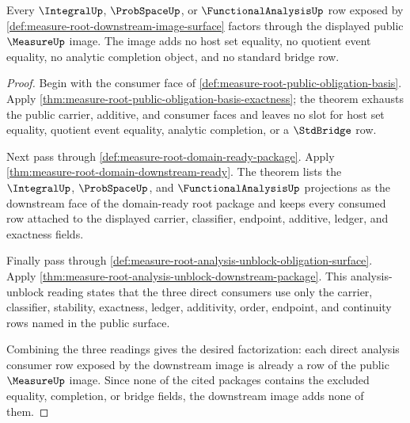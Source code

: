 \begin{theorem}
\label{thm:measure-root-downstream-image-consumer}
Every $\IntegralUp$, $\ProbSpaceUp$, or $\FunctionalAnalysisUp$ row exposed
by \autoref{def:measure-root-downstream-image-surface} factors through the
displayed public $\MeasureUp$ image. The image adds no host set equality, no
quotient event equality, no analytic completion object, and no standard
bridge row.
\end{theorem}
\begin{proof}
Begin with the consumer face of
\autoref{def:measure-root-public-obligation-basis}. Apply
\autoref{thm:measure-root-public-obligation-basis-exactness}; the theorem
exhausts the public carrier, additive, and consumer faces and leaves no slot
for host set equality, quotient event equality, analytic completion, or a
$\StdBridge$ row.

Next pass through \autoref{def:measure-root-domain-ready-package}. Apply
\autoref{thm:measure-root-domain-downstream-ready}. The theorem lists the
$\IntegralUp$, $\ProbSpaceUp$, and $\FunctionalAnalysisUp$ projections as the
downstream face of the domain-ready root package and keeps every consumed row
attached to the displayed carrier, classifier, endpoint, additive, ledger,
and exactness fields.

Finally pass through
\autoref{def:measure-root-analysis-unblock-obligation-surface}. Apply
\autoref{thm:measure-root-analysis-unblock-downstream-package}. This
analysis-unblock reading states that the three direct consumers use only the
carrier, classifier, stability, exactness, ledger, additivity, order,
endpoint, and continuity rows named in the public surface.

Combining the three readings gives the desired factorization: each direct
analysis consumer row exposed by the downstream image is already a row of
the public $\MeasureUp$ image. Since none of the cited packages contains the
excluded equality, completion, or bridge fields, the downstream image adds
none of them.
\end{proof}
